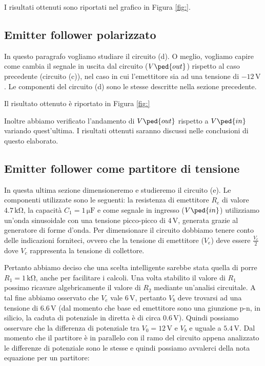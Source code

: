 I risultati ottenuti sono riportati nel grafico in Figura \ref{fig:}.

\subsection*{Emitter follower polarizzato}

In questo paragrafo vogliamo studiare il circuito (d). O meglio, vogliamo capire come cambia il segnale in uscita dal circuito ($V\ped{out}$) rispetto al caso precedente (circuito (c)), nel caso in cui l'emettitore sia ad una tensione di $-12\,\si{\volt}$.
Le componenti del circuito (d) sono le stesse descritte nella sezione precedente.

Il risultato ottenuto è riportato in Figura \ref{fig:}

Inoltre abbiamo verificato l'andamento di $V\ped{out}$ rispetto a $V\ped{in}$ variando quest'ultima. I risultati ottenuti saranno discussi nelle conclusioni di questo elaborato.

\subsection*{Emitter follower come partitore di tensione}

In questa ultima sezione dimensioneremo e studieremo il circuito (e). Le componenti utilizzate sono le seguenti: la resistenza di emettitore $R_e$ di valore $4.7\,\si{\kilo\ohm}$, la capacità $C_1=1\,\si{\micro\farad}$ e come segnale in ingresso ($V\ped{in}$) utilizziamo un'onda sinusoidale con una tensione picco-picco di $4\,\si{\volt}$, generata grazie al generatore di forme d'onda.
Per dimensionare il circuito dobbiamo tenere conto delle indicazioni forniteci, ovvero che la tensione di emettitore ($V_e$) deve essere $\frac{V_c}{2}$ dove $V_c$ rappresenta la tensione di collettore.

Pertanto abbiamo deciso che una scelta intelligente sarebbe stata quella di porre $R_1=1\,\si{\kilo\ohm}$, anche per facilitare i calcoli. Una volta stabilito il valore di $R_1$ possimo ricavare algebricamente il valore di $R_2$ mediante un'analisi circuitale.
A tal fine abbiamo osservato che $V_e$ vale $6\,\si{\volt}$, pertanto $V_b$ deve trovarsi ad una tensione di $6.6\,\si{\volt}$ (dal momento che base ed emettitore sono una giunzione p-n, in silicio, la caduta di potenziale in diretta è di circa $0.6\,\si{\volt}$). Quindi possiamo osservare che la differenza di potenziale tra $V_0=12\,\si{\volt}$ e $V_b$ e uguale a $5.4\,\si{\volt}$.
Dal momento che il partitore è in parallelo con il ramo del circuito appena analizzato le differenze di potenziale sono le stesse e quindi possiamo avvalerci della nota equazione per un partitore:

